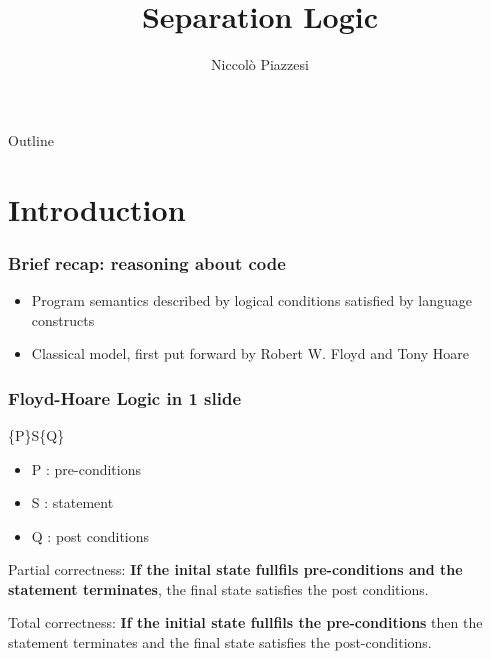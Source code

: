 \documentclass{beamer}
\title{Separation Logic}
\author{Niccolò Piazzesi}
\institute[UniPi]{
    Università degli studi di Pisa \\
    Anno Accademico 2021-22
}
\begin{document}
    \begin{frame}
        \maketitle
    \end{frame}
    \begin{frame}{Outline}
        \tableofcontents[hideallsubsections]
    \end{frame}
    \section{Introduction}
    \begin{frame}
            \frametitle{Brief recap: reasoning about code}
            
            \begin{itemize}
                \item Program semantics described by logical conditions satisfied by language constructs
                \item Classical model, first put forward by Robert W. Floyd and Tony Hoare
            \end{itemize}
            
        
    \end{frame}
    \begin{frame}
        \frametitle{Floyd-Hoare Logic in 1 slide}
        \begin{center}
            \huge
            \{P\}S\{Q\}
        \end{center}
        \begin{itemize}
            \item P : pre-conditions
            \item S : statement
            \item Q : post conditions
        \end{itemize}
        \bigskip
        
        Partial correctness: \textbf{If the inital state fullfils pre-conditions and the statement terminates}, the final state satisfies the post conditions.
        \medskip

        Total correctness: \textbf{If the initial state fullfils the pre-conditions} then the statement terminates and the final state satisfies the post-conditions.
    \end{frame}
\end{document}
